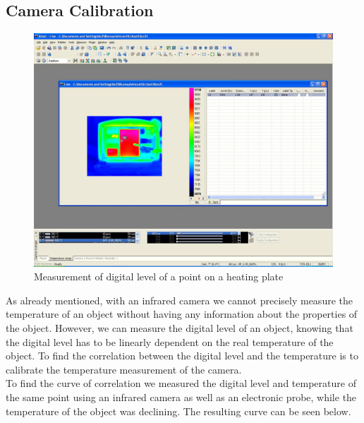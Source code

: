\documentclass[english]{article}
\begin{document}
\subsection{Camera Calibration}
\begin{figure}[H]
	\centering
	\includegraphics[width=1\linewidth]{Pictures/calib.JPG}
	\caption{Measurement of digital level of a point on a heating plate}
	\label{fig:four}
\end{figure}
As already mentioned, with an infrared camera we cannot precisely measure the temperature of an object without having any information about the properties of the object.
However, we can measure the digital level of an object, knowing that the digital level has to be linearly dependent on the real temperature of the object.
To find the correlation between the digital level and the temperature is to calibrate the temperature measurement of the camera.\\
To find the curve of correlation we measured the digital level and temperature of the same point using an infrared camera as well as an electronic probe, while the temperature of the object was declining.
The resulting curve can be seen below.\\
\end{document}
